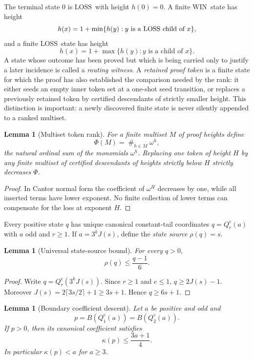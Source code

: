 \documentclass[11pt]{article}
\newtheorem{lemma}[theorem]{Lemma}
\newcommand{\WIN}{\ensuremath{\mathrm{WIN}}}
\newcommand{\LOSS}{\ensuremath{\mathrm{LOSS}}}
\begin{document}
The terminal state $0$ is \LOSS\ with height $h(0)=0$. A finite \WIN\ state has
height
\[
  h(x)=1+\min\{h(y):y\text{ is a \LOSS\ child of }x\},
\]
and a finite \LOSS\ state has height
\[
  h(x)=1+\max\{h(y):y\text{ is a child of }x\}.
\]
A state whose outcome has been proved but which is being carried only to
justify a later incidence is called a \emph{routing witness}. A
\emph{retained proof token} is a finite state for which the proof has also
established the comparison needed by the rank: it either seeds an empty inner
token set at a one-shot seed transition, or replaces a previously retained
token by certified descendants of strictly smaller height. This distinction is
important: a newly discovered finite state is never silently appended to a
ranked multiset.

\begin{lemma}[Multiset token rank]\label{lem:token-rank}
For a finite multiset $M$ of proof heights define
\[
  \Phi(M)=\mathop{\#}_{h\in M}\omega^h,
\]
the natural ordinal sum of the monomials $\omega^h$. Replacing one token of
height $H$ by any finite multiset of certified descendants of heights strictly
below $H$ strictly decreases $\Phi$.
\end{lemma}

\begin{proof}
In Cantor normal form the coefficient of $\omega^H$ decreases by one, while
all inserted terms have lower exponent. No finite collection of lower terms
can compensate for the loss at exponent $H$.
\end{proof}

Every positive state $q$ has unique canonical constant-tail coordinates
$q=Q_r^e(a)$ with $a$ odd and $r\ge1$. If
$a=3^kJ(s)$, define the \emph{state source} $\rho(q)=s$.

\begin{lemma}[Universal state-source bound]\label{lem:source-bound}
For every $q>0$,
\[
  \rho(q)\le \frac{q-1}{6}.
\]
\end{lemma}

\begin{proof}
Write $q=Q_r^e(3^kJ(s))$. Since $r\ge1$ and $e\le1$,
$q\ge2J(s)-1$. Moreover
$J(s)=2\lceil3s/2\rceil+1\ge3s+1$. Hence
$q\ge6s+1$.
\end{proof}

\begin{lemma}[Boundary coefficient descent]\label{lem:boundary-coeff}
Let $a$ be positive and odd and
\[
 p=B(Q_1^e(a))=B(Q_2^e(a)).
\]
If $p>0$, then its canonical coefficient satisfies
\[
  \kappa(p)\le\frac{3a+1}{4}.
\]
In particular $\kappa(p)<a$ for $a\ge3$.
\end{lemma}
\end{document}
